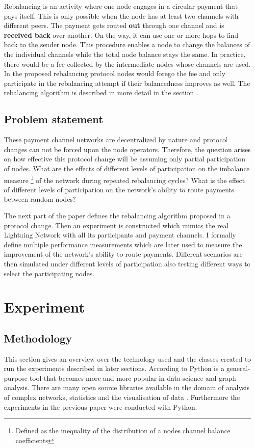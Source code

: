 \documentclass[final]{fhnwreport}       %
\begin{document}
Rebalancing is an activity where one node engages in a circular payment that pays itself. This is only possible when the node has at least two channels with different peers. The payment gets routed \textbf{out} through one channel and is \textbf{received back} over another. On the way, it can use one or more hops to find back to the sender node. This procedure enables a node to change the balances of the individual channels while the total node balance stays the same. In practice, there would be a fee collected by the intermediate nodes whose channels are used. In the proposed rebalancing protocol nodes would forego the fee and only participate in the rebalancing attempt if their balancedness improves as well. The rebalancing algorithm is described in more detail in the section . 


\subsection{Problem statement}
These payment channel networks are decentralized by nature and protocol changes can not be forced upon the node operators. Therefore, the question arises on how effective this protocol change will be assuming only partial participation of nodes. What are the effects of different levels of participation on the imbalance measure \footnote{Defined as the inequality of the distribution of a nodes channel balance coefficients} of the network during repeated rebalancing cycles? What is the effect of different levels of participation on the network's ability to route payments between random nodes? 

The next part of the paper defines the rebalancing algorithm proposed in a protocol change. Then an experiment is constructed which mimics the real Lightning Network with all its participants and payment channels. I formally define multiple performance measurements which are later used to measure the improvement of the network's ability to route payments. Different scenarios are then simulated under different levels of participation also testing different ways to select the participating nodes.

\newpage
\section{Experiment}\label{sec:method}
\subsection{Methodology}
This section gives an overview over the technology used and the classes created to run the experiments described in later sections. According to \citeauthor{al-taie_python_2017} Python is a general-purpose tool that becomes more and more popular in data science and graph analysis. There are many open source libraries available in the domain of analysis of complex networks, statistics and the visualisation of data \citep{al-taie_python_2017}. Furthermore the experiments in the previous paper were conducted with Python. 
\end{document}
